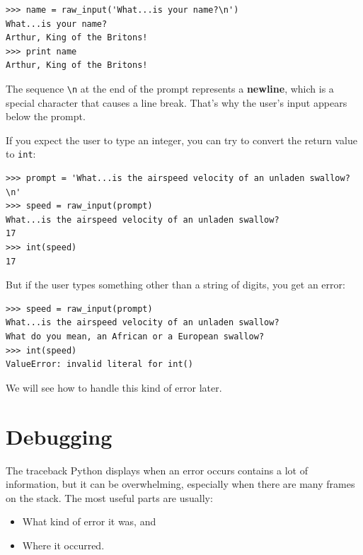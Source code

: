 \documentclass[10pt]{book}
\begin{document}

\beforeverb
\begin{verbatim}
>>> name = raw_input('What...is your name?\n')
What...is your name?
Arthur, King of the Britons!
>>> print name
Arthur, King of the Britons!
\end{verbatim}
\afterverb
%
The sequence \verb"\n" at the end of the prompt represents a {\bf newline},
which is a special character that causes a line break.
That's why the user's input appears below the prompt.


If you expect the user to type an integer, you can try to convert
the return value to {\tt int}:

\beforeverb
\begin{verbatim}
>>> prompt = 'What...is the airspeed velocity of an unladen swallow?\n'
>>> speed = raw_input(prompt)
What...is the airspeed velocity of an unladen swallow?
17
>>> int(speed)
17
\end{verbatim}
\afterverb
%
But if the user types something other than a string of digits,
you get an error:

\beforeverb
\begin{verbatim}
>>> speed = raw_input(prompt)
What...is the airspeed velocity of an unladen swallow?
What do you mean, an African or a European swallow?
>>> int(speed)
ValueError: invalid literal for int()
\end{verbatim}
\afterverb
%
We will see how to handle this kind of error later.



\section{Debugging}
\label{whitespace}

The traceback Python displays when an error occurs contains
a lot of information, but it can be overwhelming, especially
when there are many frames on the stack.  The most
useful parts are usually:

\begin{itemize}

\item What kind of error it was, and

\item Where it occurred.

\end{itemize}
\end{document}

